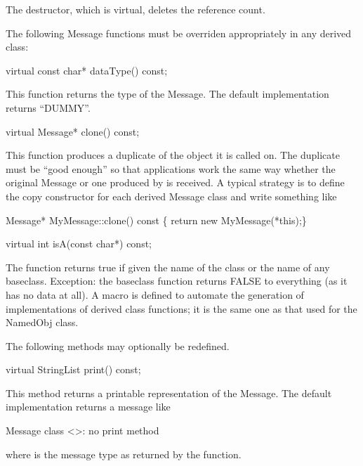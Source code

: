 The destructor, which is virtual, deletes the reference count.

The following Message functions must be overriden appropriately in any
derived class:

\begin{example}
virtual const char* dataType() const;
\end{example}

This function returns the type of the Message.  The default
implementation returns ``DUMMY''.

\begin{example}
virtual Message* clone() const;
\end{example}

This function produces a duplicate of the object it is called on.
The duplicate must be ``good enough'' so that applications work the
same way whether the original Message or one produced by 
is received.  A typical strategy is to define the copy constructor
for each derived Message class and write something like

\begin{example}
Message* MyMessage::clone() const \{ return new MyMessage(*this);\}
\end{example}

\begin{example}
virtual int isA(const char*) const;
\end{example}

The  function returns true if given the name of the class
or the name of any baseclass.  Exception: the baseclass function returns
FALSE to everything (as it has no data at all).  A macro 
is defined to automate the generation of implementations of derived
class  functions; it is the same one as that used for the
NamedObj class.

The following methods may optionally be redefined.

\begin{example}
virtual StringList print() const;
\end{example}

This method returns a printable representation of the Message.
The default implementation returns a message like

\begin{example}
Message class <>: no print method
\end{example}

where  is the message type as returned by the 
function.


